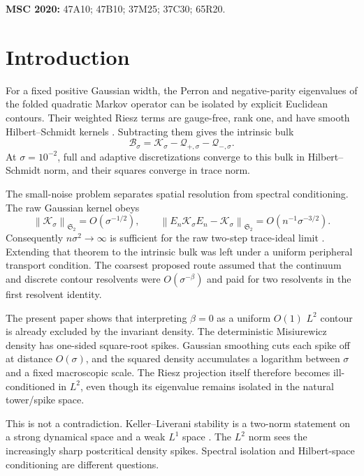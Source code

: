 \documentclass[11pt]{article}
\theoremstyle{remark}
\newcommand{\cK}{\mathcal K}
\newcommand{\cB}{\mathcal B}
\newcommand{\cQ}{\mathcal Q}
\newcommand{\norm}[1]{\left\lVert#1\right\rVert}
\newcommand{\HS}{\mathfrak S_2}
\begin{document}
\noindent\textbf{MSC 2020:} 47A10; 47B10; 37M25; 37C30; 65R20.

\section{Introduction}

For a fixed positive Gaussian width, the Perron and negative-parity
eigenvalues of the folded quadratic Markov operator can be isolated by
explicit Euclidean contours.  Their weighted Riesz terms are gauge-free,
rank one, and have smooth Hilbert--Schmidt kernels
\citep{WangRieszBridge2026,WangEuclideanContour2026,WangRankTwo2026}.
Subtracting them gives the intrinsic bulk
\begin{equation}
 \cB_\sigma
 =\cK_\sigma-\cQ_{+,\sigma}-\cQ_{-,\sigma}.
 \label{eq:bulk}
\end{equation}
At $\sigma=10^{-2}$, full and adaptive discretizations converge to this
bulk in Hilbert--Schmidt norm, and their squares converge in trace norm.

The small-noise problem separates spatial resolution from spectral
conditioning.  The raw Gaussian kernel obeys
\begin{equation}
 \norm{\cK_\sigma}_{\HS}=O(\sigma^{-1/2}),
 \qquad
 \norm{E_n\cK_\sigma E_n-\cK_\sigma}_{\HS}
 =O(n^{-1}\sigma^{-3/2}).
 \label{eq:raw-mesh}
\end{equation}
Consequently $n\sigma^2\to\infty$ is sufficient for the raw two-step
trace-ideal limit \citep{WangSmallNoiseMesh2026}.  Extending that theorem to
the intrinsic bulk was left under a uniform peripheral transport condition.
The coarsest proposed route assumed that the continuum and discrete contour
resolvents were $O(\sigma^{-\beta})$ and paid for two resolvents in the first
resolvent identity.

The present paper shows that interpreting $\beta=0$ as a uniform $O(1)$
$L^2$ contour is already excluded by the invariant density.  The
deterministic Misiurewicz density has one-sided square-root spikes.  Gaussian
smoothing cuts each spike off at distance $O(\sigma)$, and the squared
density accumulates a logarithm between $\sigma$ and a fixed macroscopic
scale.  The Riesz projection itself therefore becomes ill-conditioned in
$L^2$, even though its eigenvalue remains isolated in the natural
tower/spike space.

This is not a contradiction.  Keller--Liverani stability is a two-norm
statement on a strong dynamical space and a weak $L^1$ space
\citep{KellerLiverani1999}.  The $L^2$ norm sees the increasingly sharp
postcritical density spikes.  Spectral isolation and Hilbert-space
conditioning are different questions.
\end{document}
